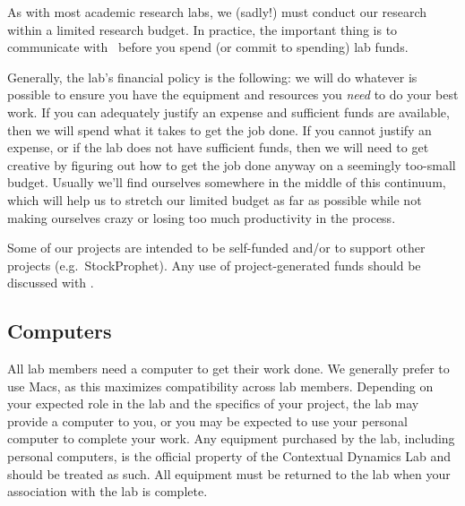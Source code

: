 \documentclass{tufte-book} %
\begin{document}

\noindent  As with most academic research labs, we (sadly!) must conduct our
 research within a limited research budget.  In practice, the
 important thing is to communicate with \director~before you spend (or
 commit to spending) lab funds.

 Generally, the lab's financial policy is the following: we will do
 whatever is possible to ensure you have the equipment and resources
 you \textit{need} to do your best work.  If you can adequately
 justify an expense and sufficient funds are available, then we will
 spend what it takes to get the job done.  If you cannot justify an
 expense, or if the lab does not have sufficient funds, then we will
 need to get creative by figuring out how to get the job done anyway
 on a seemingly too-small budget.  Usually we'll find ourselves
 somewhere in the middle of this continuum, which will help us to
 stretch our limited budget as far as possible while not making
 ourselves crazy or losing too much productivity in the process.

 Some of our projects are intended to be self-funded and/or to support
 other projects (e.g.\ StockProphet).  Any use of project-generated
 funds should be discussed with \director.

 \subsection{Computers}
All lab members need a computer to get their work done.  We generally
prefer to use Macs, as this maximizes compatibility across lab
members.  Depending on your expected role in the lab and the specifics
of your project, the lab may provide a computer to you, or you may be
expected to use your personal computer to complete your work.  Any
equipment purchased by the lab, including personal computers, is the
official property of the Contextual Dynamics Lab and should be treated
as such.  All equipment must be returned to the lab when your
association with the lab is complete.
\end{document}
